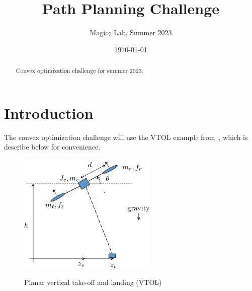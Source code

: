 \documentclass{article}
\title{Path Planning Challenge}
\author{Magicc Lab, Summer 2023}
\date{\today}
\begin{document}
\maketitle
\thispagestyle{empty}

    \begin{abstract}
        Convex optimization challenge for summer 2023.
    \end{abstract}

\section{Introduction}

The convex optimization challenge will use the VTOL example from~\cite{BeardMcLainPeterson}, which is describe below for convenience.  


\begin{figure}
  \centering
  \includegraphics[width=0.59\textwidth]{figures/hw_planar_VTOL_defn}\\
  \caption{Planar vertical take-off and landing (VTOL)}
  \label{fig:planar_VTOL_defn}
\end{figure}
\end{document}

